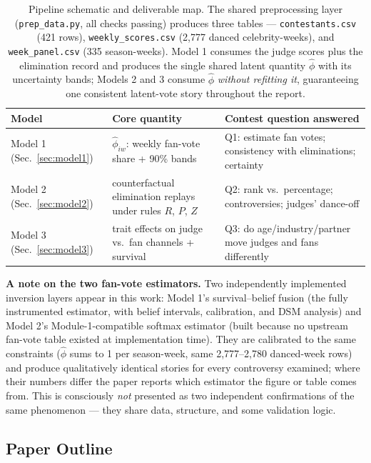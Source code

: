 \documentclass[10pt]{article}
\begin{document}
\begin{table}[H]
\centering
\caption{Pipeline schematic and deliverable map. The shared preprocessing layer
(\texttt{prep\_data.py}, all checks passing) produces three tables ---
\texttt{contestants.csv} (421 rows), \texttt{weekly\_scores.csv} (2{,}777 danced
celebrity-weeks), and \texttt{week\_panel.csv} (335 season-weeks). Model 1 consumes
the judge scores plus the elimination record and produces the single shared latent
quantity $\hat\phi$ with its uncertainty bands; Models 2 and 3 consume $\hat\phi$
\emph{without refitting it}, guaranteeing one consistent latent-vote story throughout
the report.}
\label{tab:deliverablemap}
\begin{tabular}{p{2.6cm}p{5.4cm}p{5.6cm}}
\toprule
Model & Core quantity & Contest question answered \\
\midrule
Model 1 (Sec.~\ref{sec:model1}) & $\hat\phi_{iw}$: weekly fan-vote share + 90\% bands
& Q1: estimate fan votes; consistency with eliminations; certainty \\
Model 2 (Sec.~\ref{sec:model2}) & counterfactual elimination replays under rules $R$, $P$, $Z$
& Q2: rank vs.\ percentage; controversies; judges' dance-off \\
Model 3 (Sec.~\ref{sec:model3}) & trait effects on judge vs.\ fan channels + survival
& Q3: do age/industry/partner move judges and fans differently \\
\bottomrule
\end{tabular}
\end{table}

\textbf{A note on the two fan-vote estimators.} Two independently implemented inversion
layers appear in this work: Model 1's survival--belief fusion (the fully instrumented
estimator, with belief intervals, calibration, and DSM analysis) and Model 2's
Module-1-compatible softmax estimator (built because no upstream fan-vote table existed at
implementation time). They are calibrated to the same constraints ($\hat\phi$ sums to 1 per
season-week, same 2{,}777--2{,}780 danced-week rows) and produce qualitatively identical
stories for every controversy examined; where their numbers differ the paper reports which
estimator the figure or table comes from. This is consciously \emph{not} presented as two
independent confirmations of the same phenomenon --- they share data, structure, and some
validation logic.

\subsection{Paper Outline}
\end{document}
